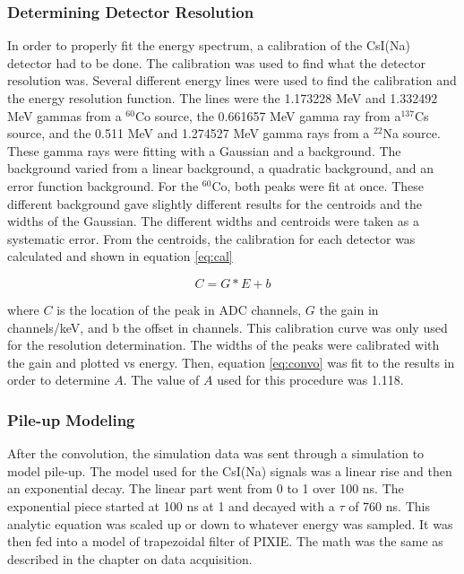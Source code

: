 \subsubsection{Determining Detector Resolution}
In order to properly fit the energy spectrum, a calibration of the CsI(Na) detector had to be done.
The calibration was used to find what the detector resolution was.
Several different energy lines were used to find the calibration and the energy resolution function.
The lines were the 1.173228 MeV and 1.332492 MeV gammas from a $^{60}$Co source, the 0.661657 MeV gamma ray from a$^{137}$Cs source, and the 0.511 MeV and 1.274527 MeV gamma rays from a $^{22}$Na source.
These gamma rays were fitting with a Gaussian and a background.
The background varied from a linear background, a quadratic background, and an error function background.
For the $^{60}$Co, both peaks were fit at once.
These different background gave slightly different results for the centroids and the widths of the Gaussian.
The different widths and centroids were taken as a systematic error.
From the centroids, the calibration for each detector was calculated and shown in equation \ref{eq:cal}

\begin{equation}
	C = G * E + b
	\label{eq:cal}
\end{equation}

where $C$ is the location of the peak in ADC channels, $G$ the gain in channels/keV, and b the offset in channels.
This calibration curve was only used for the resolution determination.
The widths of the peaks were calibrated with the gain and plotted vs energy.
Then, equation \ref{eq:convo} was fit to the results in order to determine $A$.
The value of $A$ used for this procedure was 1.118.

\subsubsection{Pile-up Modeling}
After the convolution, the simulation data was sent through a simulation to model pile-up.
The model used for the CsI(Na) signals was a linear rise and then an exponential decay.
The linear part went from 0 to 1 over 100 ns. 
The exponential piece started at 100 ns at 1 and decayed with a $\tau$ of 760 ns.
This analytic equation was scaled up or down to whatever energy was sampled.
It was then fed into a model of trapezoidal filter of PIXIE. 
The math was the same as described in the chapter on data acquisition.


